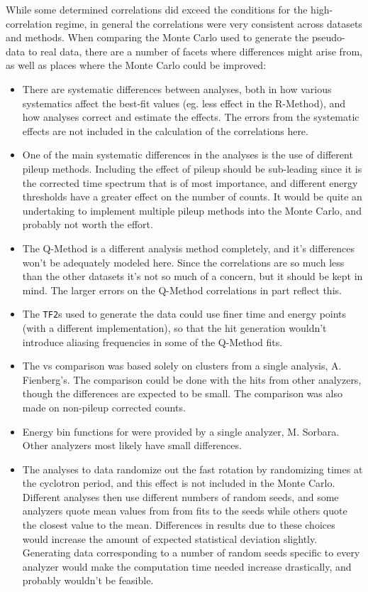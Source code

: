 While some determined correlations did exceed the conditions for the high-correlation regime, in general the correlations were very consistent across datasets and methods. When comparing the Monte Carlo used to generate the pseudo-data to real data, there are a number of facets where differences might arise from, as well as places where the Monte Carlo could be improved:
\begin{itemize}
	\item{There are systematic differences between analyses, both in how various systematics affect the best-fit \R values (eg. less effect in the R-Method), and how analyses correct and estimate the effects. The errors from the systematic effects are not included in the calculation of the correlations here.}
	\item{One of the main systematic differences in the analyses is the use of different pileup methods. Including the effect of pileup should be sub-leading since it is the corrected time spectrum that is of most importance, and different energy thresholds have a greater effect on the number of counts. It would be quite an undertaking to implement multiple pileup methods into the Monte Carlo, and probably not worth the effort.}
	\item{The Q-Method is a different analysis method completely, and it's differences won't be adequately modeled here. Since the correlations are so much less than the other datasets it's not so much of a concern, but it should be kept in mind. The larger errors on the Q-Method correlations in part reflect this.}
	\item{The \ROOT \texttt{TF2}s used to generate the data could use finer time and energy points (with a different implementation), so that the hit generation wouldn't introduce aliasing frequencies in some of the Q-Method fits.}
	\item{The \RE vs \RW comparison was based solely on clusters from a single \RW analysis, A. Fienberg's. The comparison could be done with the hits from other \RW analyzers, though the differences are expected to be small. The comparison was also made on non-pileup corrected counts.}
	\item{Energy bin functions for \RW were provided by a single \RW analyzer, M. Sorbara. Other analyzers most likely have small differences.}
	\item{The analyses to data randomize out the fast rotation by randomizing times at the cyclotron period, and this effect is not included in the Monte Carlo. Different analyses then use different numbers of random seeds, and some analyzers quote mean \R values from from fits to the seeds while others quote the closest \R value to the mean. Differences in results due to these choices would increase the amount of expected statistical deviation slightly. Generating data corresponding to a number of random seeds specific to every analyzer would make the computation time needed increase drastically, and probably wouldn't be feasible.}

\end{itemize}
